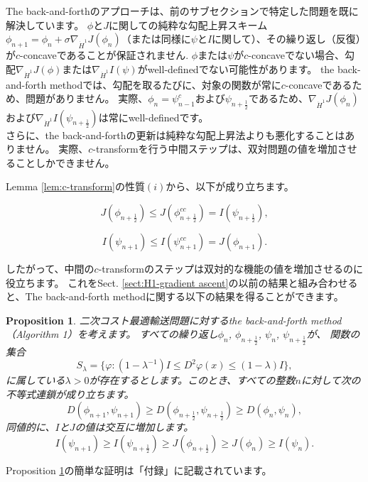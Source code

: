 \documentclass{jsarticle}
\newtheorem{prop}[thm]{Proposition}
\theoremstyle{definition}
\begin{document}
The back-and-forthのアプローチは、前のサブセクションで特定した問題を既に解決しています。 
$\phi$と$J$に関しての純粋な勾配上昇スキーム$\phi_{n + 1} = \phi_n + \sigma \nabla_{\dot{H}^1} J(\phi_n)$（または同様に$\psi$と$I$に関して）、その繰り返し（反復）が$c$-concaveであることが保証されません.
$\phi$または$\psi$が$c$-concaveでない場合、勾配$\nabla_{\dot{H}^1} J(\phi)$または$\nabla_{\dot{H}^1} I(\psi)$がwell-definedでない可能性があります。
the back-and-forth methodでは、勾配を取るたびに、対象の関数が常に$c$-concaveであるため、問題がありません。
実際、$\phi_n = \psi_{n -1}^c$および$\psi_{n + \frac{1}{2}}$であるため、$\nabla_{\dot{H}^1} J(\phi_n)$および$\nabla_{\dot{H}^1} I(\psi_{n + \frac{1}{2}})$は常にwell-definedです。\\


さらに、the back-and-forthの更新は純粋な勾配上昇法よりも悪化することはありません。
実際、$c$-transformを行う中間ステップは、双対問題の値を増加させることしかできません。
{\color{teal}
Lemma \ref{lem:c-transform}の性質$(i)$から、以下が成り立ちます。

$$
J(\phi_{n + \frac{1}{2}}) \leq J(\phi_{n + \frac{1}{2}}^{cc}) = I(\psi_{n + \frac{1}{2}}),
$$

$$
I(\psi_{n+1}) \leq I(\psi_{n + 1}^{cc}) = J(\phi_{n+1}).
$$
}

したがって、中間の$c$-transformのステップは双対的な機能の値を増加させるのに役立ちます。
これをSect. \ref{sect:H1-gradient ascent}の以前の結果と組み合わせると、The back-and-forth methodに関する以下の結果を得ることができます。\\

\color{teal}
\begin{prop}
  \label{prop:不等式連鎖}
  二次コスト最適輸送問題に対するthe back-and-forth method（Algorithm 1）を考えます。
  すべての繰り返し$\phi_n$, $\phi_{n + \frac{1}{2}}$, $\psi_n$, $\psi_{n + \frac{1}{2}}$が、
  関数の集合
  $$
  S_{\lambda}=\{\varphi:(1-\lambda^{-1})I\leq D^2\varphi(x)\leq (1-\lambda)I\},
  $$
  に属している$\lambda > 0$が存在するとします。このとき、すべての整数$n$に対して次の不等式連鎖が成り立ちます。
  $$
  D(\phi_{n+1},\psi_{n+1})\geq D(\phi_{n + \frac{1}{2}},\psi_{n + \frac{1}{2}})\geq D(\phi_n,\psi_n),
  $$
  同値的に、$I$と$J$の値は交互に増加します。
  $$
  I(\psi_{n+1})\geq I(\psi_{n + \frac{1}{2}})\geq J(\phi_{n + \frac{1}{2}})\geq J(\phi_n)\geq I(\psi_n).
  $$
\end{prop}

\color{black}
Proposition \ref{prop:不等式連鎖}の簡単な証明は「付録」に記載されています。
\end{document}
